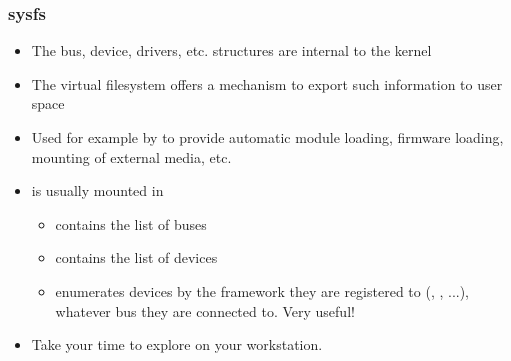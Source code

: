 \begin{frame}
  \frametitle{sysfs}
  \begin{itemize}
  \item The bus, device, drivers, etc. structures are internal to the
    kernel
  \item The  virtual filesystem offers a mechanism to
    export such information to user space
  \item Used for example by  to provide automatic module loading,
    firmware loading, mounting of external media, etc.
  \item {} is usually mounted in 
    \begin{itemize}
    \item {} contains the list of buses
    \item {} contains the list of devices
    \item {} enumerates devices by the framework they are
          registered to (, , ...),
          whatever bus they are connected to. Very useful!
    \end{itemize}
  \item Take your time to explore  on your workstation.
  \end{itemize}
\end{frame}


